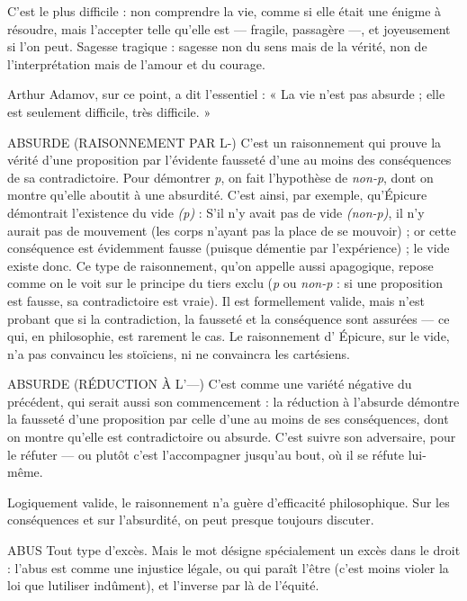 C’est le plus difficile : non comprendre la vie, comme si elle était une
énigme à résoudre, mais l’accepter telle qu’elle est — fragile, passagère —, et
joyeusement si l’on peut. Sagesse tragique : sagesse non du sens mais de la
vérité, non de l'interprétation mais de l’amour et du courage.

Arthur Adamov, sur ce point, a dit l'essentiel : « La vie n’est pas absurde ;
elle est seulement difficile, très difficile. »

ABSURDE (RAISONNEMENT PAR L-) C'est un raisonnement qui prouve
la vérité d’une proposition par
l’évidente fausseté d’une au moins des conséquences de sa contradictoire.
Pour démontrer {\it p}, on fait l'hypothèse de {\it non-p}, dont on montre qu’elle
aboutit à une absurdité. C’est ainsi, par exemple, qu'Épicure démontrait
l'existence du vide {\it (p)} : S'il n’y avait pas de vide {\it (non-p)}, il n’y aurait pas de
mouvement (les corps n’ayant pas la place de se mouvoir) ; or cette conséquence
est évidemment fausse (puisque démentie par l’expérience) ; le vide
existe donc. Ce type de raisonnement, qu’on appelle aussi apagogique,
repose comme on le voit sur le principe du tiers exclu ({\it p} ou {\it non-p} : si une
proposition est fausse, sa contradictoire est vraie). Il est formellement valide,
mais n’est probant que si la contradiction, la fausseté et la conséquence sont
assurées — ce qui, en philosophie, est rarement le cas. Le raisonnement
d’ Épicure, sur le vide, n’a pas convaincu les stoïciens, ni ne convaincra les
cartésiens.

ABSURDE (RÉDUCTION À L’—) C’est comme une variété négative du précédent,
qui serait aussi son commencement :
la réduction à l'absurde démontre la fausseté d’une proposition par celle
d’une au moins de ses conséquences, dont on montre qu’elle est contradictoire
ou absurde. C’est suivre son adversaire, pour le réfuter — ou plutôt c’est
l’accompagner jusqu’au bout, où il se réfute lui-même.

Logiquement valide, le raisonnement n’a guère d’efficacité philosophique.
Sur les conséquences et sur l’absurdité, on peut presque toujours discuter.

ABUS Tout type d’excès. Mais le mot désigne spécialement un excès dans le
droit : l’abus est comme une injustice légale, ou qui paraît l’être (c’est
moins violer la loi que lutiliser indûment), et l'inverse par là de l'équité.

